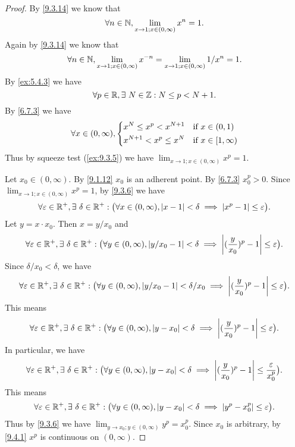 \begin{proof}
  By \cref{9.3.14} we know that
  \[
    \forall n \in \mathbb{N}, \lim_{x \to 1 ; x \in (0, \infty)} x^n = 1.
  \]
  Again by \cref{9.3.14} we know that
  \[
    \forall n \in \mathbb{N}, \lim_{x \to 1 ; x \in (0, \infty)} x^{-n} = \lim_{x \to 1 ; x \in (0, \infty)} 1 / x^n = 1.
  \]
  By \cref{ex:5.4.3} we have
  \[
    \forall p \in \mathbb{R}, \exists\ N \in \mathbb{Z} : N \leq p < N + 1.
  \]
  By \cref{6.7.3} we have
  \[
    \forall x \in (0, \infty), \begin{dcases}
      x^N \leq x^p < x^{N + 1}   & \text{if } x \in (0, 1)      \\
      x^{N + 1} < x^p \leq x^{N} & \text{if } x \in [1, \infty)
    \end{dcases}
  \]
  Thus by squeeze test (\cref{ex:9.3.5}) we have \(\lim_{x \to 1 ; x \in (0, \infty)} x^p = 1\).

  Let \(x_0 \in (0, \infty)\).
  By \cref{9.1.12} \(x_0\) is an adherent point.
  By \cref{6.7.3} \(x_0^p > 0\).
  Since \(\lim_{x \to 1 ; x \in (0, \infty)} x^p = 1\), by \cref{9.3.6} we have
  \[
    \forall \varepsilon \in \mathbb{R}^+, \exists\ \delta \in \mathbb{R}^+ : \big(\forall x \in (0, \infty), \left\lvert x - 1\right\rvert < \delta \implies \left\lvert x^p - 1\right\rvert \leq \varepsilon\big).
  \]
  Let \(y = x \cdot x_0\).
  Then \(x = y / x_0\) and
  \[
    \forall \varepsilon \in \R^+, \exists\ \delta \in \R^+ : \big(\forall y \in (0, \infty), \abs{y / x_0 - 1} < \delta \implies \abs{(\dfrac{y}{x_0})^p - 1} \leq \varepsilon\big).
  \]
  Since \(\delta / x_0 < \delta\), we have
  \[
    \forall \varepsilon \in \mathbb{R}^+, \exists\ \delta \in \mathbb{R}^+ : \big(\forall y \in (0, \infty), \left\lvert y / x_0 - 1\right\rvert < \delta / x_0 \implies \left\lvert(\dfrac{y}{x_0})^p - 1\right\rvert \leq \varepsilon\big).
  \]
  This means
  \[
    \forall \varepsilon \in \mathbb{R}^+, \exists\ \delta \in \mathbb{R}^+ : \big(\forall y \in (0, \infty), \left\lvert y - x_0\right\rvert < \delta \implies \left\lvert(\dfrac{y}{x_0})^p - 1\right\rvert \leq \varepsilon\big).
  \]
  In particular, we have
  \[
    \forall \varepsilon \in \mathbb{R}^+, \exists\ \delta \in \mathbb{R}^+ : \big(\forall y \in (0, \infty), \left\lvert y - x_0\right\rvert < \delta \implies \left\lvert(\dfrac{y}{x_0})^p - 1\right\rvert \leq \dfrac{\varepsilon}{x_0^p}\big).
  \]
  This means
  \[
    \forall \varepsilon \in \mathbb{R}^+, \exists\ \delta \in \mathbb{R}^+ : \big(\forall y \in (0, \infty), \left\lvert y - x_0\right\rvert < \delta \implies \left\lvert y^p - x_0^p\right\rvert \leq \varepsilon\big).
  \]
  Thus by \cref{9.3.6} we have \(\lim_{y \to x_0 ; y \in (0, \infty)} y^p = x_0^p\).
  Since \(x_0\) is arbitrary, by \cref{9.4.1} \(x^p\) is continuous on \((0, \infty)\).
\end{proof}

